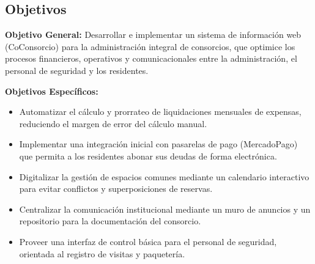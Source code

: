 \subsection{Objetivos}

\textbf{Objetivo General:}  Desarrollar e implementar un sistema de información web (CoConsorcio) para la administración integral de consorcios, que optimice los procesos financieros, operativos y comunicacionales entre la administración, el personal de seguridad y los residentes.

\textbf{Objetivos Específicos:}
\begin{itemize}
    \item Automatizar el cálculo y prorrateo de liquidaciones mensuales de expensas, reduciendo el margen de error del cálculo manual.
    \item Implementar una integración inicial con pasarelas de pago (MercadoPago) que permita a los residentes abonar sus deudas de forma electrónica.
    \item Digitalizar la gestión de espacios comunes mediante un calendario interactivo para evitar conflictos y superposiciones de reservas.
    \item Centralizar la comunicación institucional mediante un muro de anuncios y un repositorio para la documentación del consorcio.
    \item Proveer una interfaz de control básica para el personal de seguridad, orientada al registro de visitas y paquetería.
\end{itemize}
